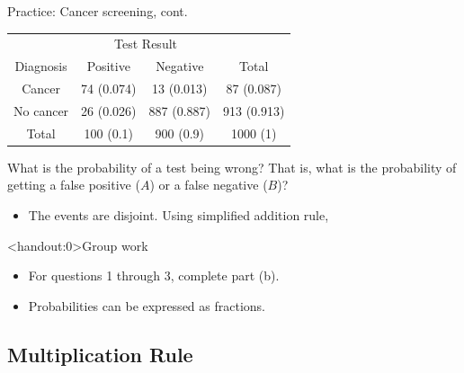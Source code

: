 \documentclass[xcolor=table, aspectratio=169, bigger]{beamer}
\begin{document}
\begin{frame}{Practice: Cancer screening, cont.}
\begin{block}{}
{\centering
\begin{tabular}{c | c  c | c}
\multicolumn{1}{c}{} & \multicolumn{2}{c}{Test Result}\\
Diagnosis & Positive & Negative & Total \\
\hline
Cancer & 74 (0.074) & 13 (0.013) & 87 (0.087)\\
No cancer & 26 (0.026) & 887 (0.887) & 913 (0.913)\\
\hline
Total & 100 (0.1) & 900 (0.9) & 1000 (1)
\end{tabular}\par
}
\end{block}

\begin{exampleblock}{}
What is the probability of a test being wrong? That is, what is the probability of getting a false positive ($A$) or a false negative ($B$)?

\begin{itemize}
\pause
\item The events are disjoint. Using simplified addition rule,\\
\smallskip{}
\pause{}
\end{itemize}
\end{exampleblock}
\end{frame}

\begin{frame}<handout:0>{Group work}
\begin{block}{}
\large
\begin{itemize}
\item For questions 1 through 3, complete part (b).
\item Probabilities can be expressed as fractions.
\end{itemize}
\end{block}
\end{frame}

%
%
\subsection{Multiplication Rule}
\end{document}
